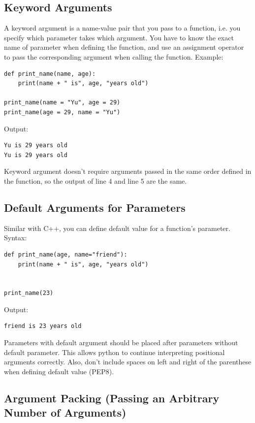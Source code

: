 \documentclass[12pt]{book}
\begin{document}
\subsection{Keyword Arguments \label{orge9952c7}}
\label{sec:org0b5784a}
A keyword argument is a name-value pair that you pass to a function, i.e. you specify which parameter takes which argument. You have to know the exact name of parameter when defining the function, and use an assignment operator to pass the corresponding argument when calling the function. Example:
\begin{verbatim}
def print_name(name, age):
    print(name + " is", age, "years old")

print_name(name = "Yu", age = 29)
print_name(age = 29, name = "Yu")
\end{verbatim}
Output:
\begin{verbatim}
Yu is 29 years old
Yu is 29 years old
\end{verbatim}
Keyword argument doesn't require arguments passed in the same order defined in the function, so the output of line 4 and line 5 are the same.

\subsection{Default Arguments for Parameters}
\label{sec:orga189206}
Similar with C++, you can define default value for a function's parameter. Syntax:
\begin{verbatim}
def print_name(age, name="friend"):
    print(name + " is", age, "years old")


print_name(23)
\end{verbatim}
Output:
\begin{verbatim}
friend is 23 years old
\end{verbatim}
Parameters with default argument should be placed after parameters without default parameter. This allows python to continue interpreting positional arguments correctly. Also, don't include spaces on left and right of the parenthese when defining default value (PEP8).

\subsection{Argument Packing (Passing an Arbitrary Number of Arguments)}
\label{sec:org0235f66}
\end{document}
